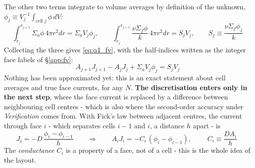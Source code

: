 \documentclass[11pt]{article}
\begin{document}
{The other two terms integrate to volume averages by definition of the unknown, $\phi_j \equiv V_j^{-1}\!\int_{\text{cell } j} \phi \, dV$:
\begin{equation}
    \int_{r_j}^{r_{j+1}} \Sigma_a \phi \, 4\pi r^2 dr = \Sigma_a V_j \phi_j,
    \qquad
    \int_{r_j}^{r_{j+1}} \frac{\nu\Sigma_f \phi}{k} \, 4\pi r^2 dr = S_j V_j,
    \qquad S_j \equiv \frac{\nu\Sigma_f \phi_j}{k}
\end{equation}
Collecting the three gives \eqref{eq:q4_fv}, with the half-indices written as the integer face labels of \S\ref{app:fv}:
\begin{equation}
    A_{j+1} J_{j+1} - A_j J_j + \Sigma_a V_j \phi_j = S_j V_j
    \label{eq:fv_balance}
\end{equation}
Nothing has been approximated yet: this is an exact statement about cell averages and true face currents, for any $N$. \textbf{The discretisation enters only in the next step}, where the face current is replaced by a difference between neighbouring cell centres - which is also where the second-order accuracy under \emph{Verification} comes from. With Fick's law between adjacent centres, the current through face $i$ - which separates cells $i-1$ and $i$, a distance $h$ apart - is
\begin{equation}
    J_i = -D\,\frac{\phi_i - \phi_{i-1}}{h}
    \qquad\Longrightarrow\qquad
    A_i J_i = -C_i\,(\phi_i - \phi_{i-1}), \qquad
    \boxed{\;C_i \equiv \frac{D A_i}{h}\;}
\end{equation}
The \emph{conductance} $C_i$ is a property of a face, not of a cell - this is the whole idea of the layout.

}
\end{document}
